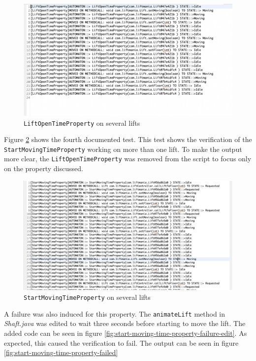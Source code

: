 \documentclass[a4paper, 12pt]{article}
\begin{document}
\begin{figure}
   \centering
   \includegraphics[width=\textwidth,height=\textheight,keepaspectratio]{images/lift-open-test-multiple} %
   \caption{\texttt{LiftOpenTimeProperty} on several lifts}
   \label{fig:lift-open-test-multiple}
\end{figure}

Figure \ref{fig:start-moving-time-property-several} shows the fourth documented test. This test shows the verification of the \texttt{StartMovingTimeProperty} working on more than one lift. To make the output more clear, the \texttt{LiftOpenTimeProperty} was removed from the script to focus only on the property discussed. \\
\begin{figure}
   \centering
   \includegraphics[width=\textwidth,height=\textheight,keepaspectratio]{images/start-moving-time-property-several} %
   \caption{\texttt{StartMovingTimeProperty} on several lifts}
   \label{fig:start-moving-time-property-several}
\end{figure}

A failure was also induced for this property. The \texttt{animateLift} method in \textit{Shaft.java} was edited to wait three seconds before starting to move the lift. The added code can be seen in figure \ref{fig:start-moving-time-property-failure-edit}. As expected, this caused the verification to fail. The output can be seen in figure \ref{fig:start-moving-time-property-failed}
\end{document}
